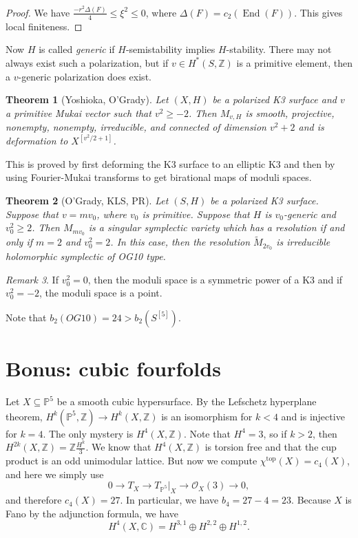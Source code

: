 \documentclass[leqno, openany]{memoir}
\newtheorem{thm}{Theorem}[section]
\theoremstyle{definition}
\theoremstyle{remark}
\newtheorem{rmk}[thm]{Remark}
\theoremstyle{plain}
\theoremstyle{definition}
\theoremstyle{remark}
\newcommand{\C}{\mathbb{C}}
\newcommand{\Z}{\mathbb{Z}}
\renewcommand{\P}{\mathbb{P}}
\newcommand{\mc}[1]{\mathcal{#1}}
\newcommand{\mr}[1]{\mathrm{#1}}
\newcommand{\wt}[1]{\widetilde{#1}}
\DeclareMathOperator{\End}{End}
\begin{document}
\begin{proof}
    We have $\frac{-r^2 \Delta(F)}{4} \leq \xi^2 \leq 0$, where $\Delta(F) = c_2(\End(F))$. This gives local finiteness.
\end{proof}

Now $H$ is called \textit{generic} if $H$-semistability implies $H$-stability. There may not always exist such a polarization, but if $v \in H^*(S, \Z)$ is a primitive element, then a $v$-generic polarization does exist.

\begin{thm}[Yoshioka, O'Grady]
    Let $(X, H)$ be a polarized K3 surface and $v$ a primitive Mukai vector such that $v^2 \geq -2$. Then $M_{v,H}$ is smooth, projective, nonempty, nonempty, irreducible, and connected of dimension $v^2 + 2$ and is deformation to $X^{[v^2/2 + 1]}$.
\end{thm}

This is proved by first deforming the K3 surface to an elliptic K3 and then by using Fourier-Mukai transforms to get birational maps of moduli spaces.

\begin{thm}[O'Grady, KLS, PR]
    Let $(S, H)$ be a polarized K3 surface. Suppose that $v = m v_0$, where $v_0$ is primitive. Suppose that $H$ is $v_0$-generic and $v_0^2 \geq 2$. Then $M_{m v_0}$ is a singular symplectic variety which has a resolution if and only if $m = 2$ and $v_0^2 = 2$. In this case, then the resolution $\wt{M}_{2 v_0}$ is irreducible holomorphic symplectic of OG10 type.
\end{thm}

\begin{rmk}
    If $v_0^2 = 0$, then the moduli space is a symmetric power of a K3 and if $v_0^2 = -2$, the moduli space is a point.
\end{rmk}

Note that $b_2(OG10) = 24 > b_2(S^{[5]})$.

\chapter{Bonus: cubic fourfolds}%
\label{cha:bonus_cubic_fourfolds}

Let $X \subseteq \P^5$ be a smooth cubic hypersurface. By the Lefschetz hyperplane theorem, $H^k(\P^5, \Z) \to H^k(X, \Z)$ is an isomorphism for $k < 4$ and is injective for $k = 4$. The only mystery is $H^4(X, \Z)$. Note that $H^4 = 3$, so if $k > 2$, then $H^{2k}(X, \Z) = \Z \frac{H^k}{3}$. We know that $H^4(X, \Z)$ is torsion free and that the cup product is an odd unimodular lattice. But now we compute $\chi^{\mr{top}}(X) = c_4(X)$, and here we simply use
\[ 0 \to T_X \to T_{\P^5}|_X \to \mc{O}_X(3) \to 0, \]
and therefore $c_4(X) = 27$. In particular, we have $b_4 = 27-4 = 23$. Because $X$ is Fano by the adjunction formula, we have
\[ H^4(X, \C) = H^{3,1} \oplus H^{2,2} \oplus H^{1,2}. \]
\end{document}
